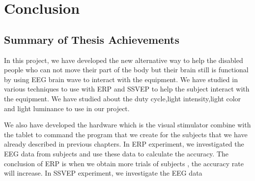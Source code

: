 \chapter{Conclusion}

\label{ch:conclusions}

\section{Summary of Thesis Achievements}

\hspace{1.5cm}
In this project, we have developed the new alternative way to help the disabled people who can not move their part of the body but their brain still is functional by using EEG brain wave to interact with the equipment. We have studied in various techniques to use with ERP and SSVEP to help the subject interact with the equipment. We have studied about the duty cycle,light intensity,light color and light luminance to use in our project.\par
We also have developed the hardware which is the visual stimulator combine with the tablet to command the program that we create for the subjects that we have already described in previous chapters. In ERP experiment, we investigated the EEG data from subjects and use these data to calculate the accuracy. The conclusion of ERP is when we obtain more trials of subjects , the accuracy rate will increase. In SSVEP experiment, we investigate the EEG data 